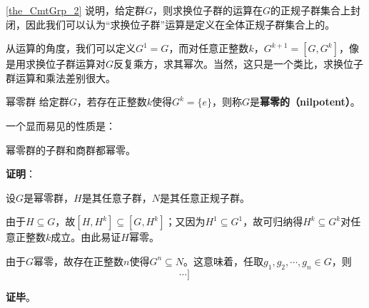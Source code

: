




\autoref{the_CmtGrp_2} 说明，给定群$G$，则求换位子群的运算在$G$的正规子群集合上封闭，因此我们可以认为“求换位子群”运算是定义在全体正规子群集合上的。

从运算的角度，我们可以定义$G^1=G$，而对任意正整数$k$，$G^{k+1}=[G, G^{k}]$，像是用求换位子群运算对$G$反复乘方，求其幂次。当然，这只是一个类比，求换位子群运算和乘法差别很大。


\begin{definition}{幂零群}
给定群$G$，若存在正整数$k$使得$G^k=\{e\}$，则称$G$是\textbf{幂零的（nilpotent）}。
\end{definition}

一个显而易见的性质是：


\begin{theorem}{}
幂零群的子群和商群都幂零。
\end{theorem}

\textbf{证明}：

设$G$是幂零群，$H$是其任意子群，$N$是其任意正规子群。

由于$H\subseteq G$，故$[H, H^{k}]\subseteq [G, H^{k}]$；又因为$H^1\subseteq G^1$，故可归纳得$H^k\subseteq G^k$对任意正整数$k$成立。由此易证$H$幂零。

由于$G$幂零，故存在正整数$n$使得$G^n\subseteq N$。这意味着，任取$g_1, g_2, \cdots, g_n\in G$，则
\begin{equation}
[\cdots[g_{n-1}, g_n]\cdots]~
\end{equation}



\textbf{证毕}。



































